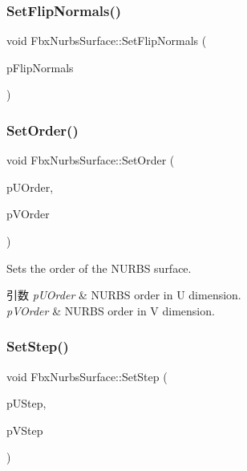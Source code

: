 \subsubsection{\texorpdfstring{Set\+Flip\+Normals()}{SetFlipNormals()}}
{\footnotesize\ttfamily void Fbx\+Nurbs\+Surface\+::\+Set\+Flip\+Normals (\begin{DoxyParamCaption}\item[{bool}]{p\+Flip\+Normals }\end{DoxyParamCaption})}

\mbox{\label{class_fbx_nurbs_surface_ad15927332a22dbd3f1f4ae51418d14c4}} 
\subsubsection{\texorpdfstring{Set\+Order()}{SetOrder()}}
{\footnotesize\ttfamily void Fbx\+Nurbs\+Surface\+::\+Set\+Order (\begin{DoxyParamCaption}\item[{\hyperlink{fbxtypes_8h_ae9fb141d8158a730aa85ec5ff2ea3f6b}{Fbx\+U\+Int}}]{p\+U\+Order,  }\item[{\hyperlink{fbxtypes_8h_ae9fb141d8158a730aa85ec5ff2ea3f6b}{Fbx\+U\+Int}}]{p\+V\+Order }\end{DoxyParamCaption})}

Sets the order of the N\+U\+R\+BS surface. 
\begin{DoxyParams}{引数}
{\em p\+U\+Order} & N\+U\+R\+BS order in U dimension. \\
\hline
{\em p\+V\+Order} & N\+U\+R\+BS order in V dimension. \\
\hline
\end{DoxyParams}
\mbox{\label{class_fbx_nurbs_surface_a8da4f135539ccdb54716ea1c2ec0fb89}} 
\subsubsection{\texorpdfstring{Set\+Step()}{SetStep()}}
{\footnotesize\ttfamily void Fbx\+Nurbs\+Surface\+::\+Set\+Step (\begin{DoxyParamCaption}\item[{int}]{p\+U\+Step,  }\item[{int}]{p\+V\+Step }\end{DoxyParamCaption})}

